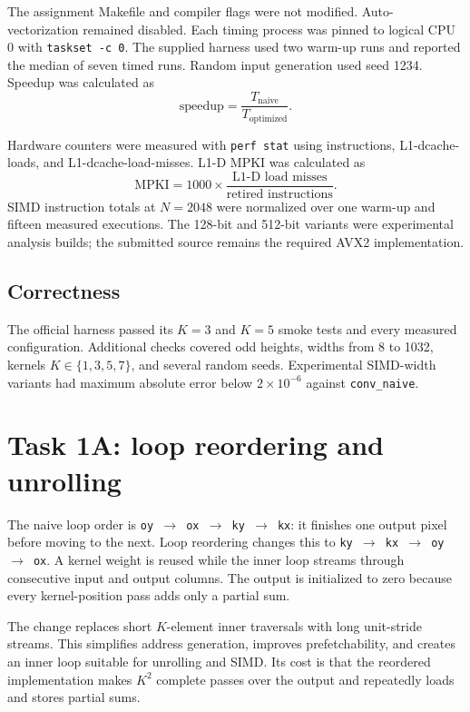 \documentclass[10pt,letterpaper]{article}
\begin{document}
The assignment Makefile and compiler flags were not modified. Auto-vectorization remained disabled. Each timing process was pinned to logical CPU 0 with \texttt{taskset -c 0}. The supplied harness used two warm-up runs and reported the median of seven timed runs. Random input generation used seed 1234. Speedup was calculated as
\[
  \text{speedup}=\frac{T_{\text{naive}}}{T_{\text{optimized}}}.
\]

Hardware counters were measured with \texttt{perf stat} using instructions, L1-dcache-loads, and L1-dcache-load-misses. L1-D MPKI was calculated as
\[
  \text{MPKI}=1000\times
  \frac{\text{L1-D load misses}}{\text{retired instructions}}.
\]
\newpage
SIMD instruction totals at $N=2048$ were normalized over one warm-up and fifteen measured executions. The 128-bit and 512-bit variants were experimental analysis builds; the submitted source remains the required AVX2 implementation.

\subsection{Correctness}

The official harness passed its $K=3$ and $K=5$ smoke tests and every measured configuration. Additional checks covered odd heights, widths from 8 to 1032, kernels $K\in\{1,3,5,7\}$, and several random seeds. Experimental SIMD-width variants had maximum absolute error below $2\times10^{-6}$ against \texttt{conv\_naive}.

\section{Task 1A: loop reordering and unrolling}

The naive loop order is \texttt{oy $\rightarrow$ ox $\rightarrow$ ky $\rightarrow$ kx}: it finishes one output pixel before moving to the next. Loop reordering changes this to \texttt{ky $\rightarrow$ kx $\rightarrow$ oy $\rightarrow$ ox}. A kernel weight is reused while the inner loop streams through consecutive input and output columns. The output is initialized to zero because every kernel-position pass adds only a partial sum.

The change replaces short $K$-element inner traversals with long unit-stride streams. This simplifies address generation, improves prefetchability, and creates an inner loop suitable for unrolling and SIMD. Its cost is that the reordered implementation makes $K^2$ complete passes over the output and repeatedly loads and stores partial sums.
\end{document}
